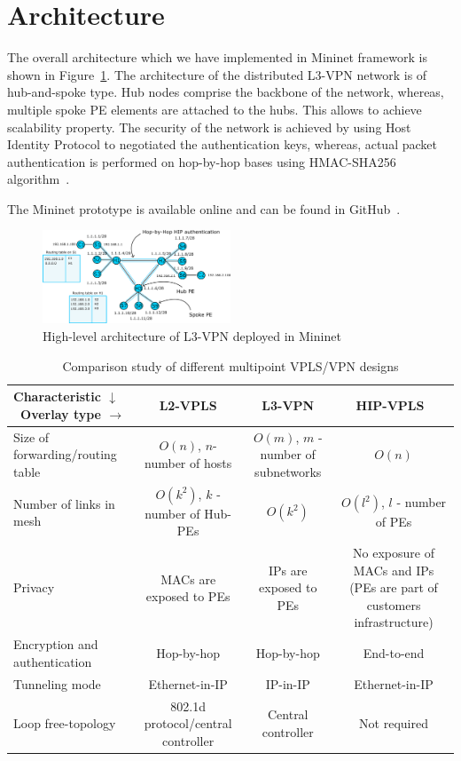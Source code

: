 \section{Architecture}
\label{section:architecture}

The overall architecture which we have implemented in Mininet framework is 
shown in Figure~\ref{fig:arch}. The architecture of the distributed L3-VPN 
network is of hub-and-spoke type. Hub nodes comprise the backbone of the network,
whereas, multiple spoke PE elements are attached to the hubs. This allows to
achieve scalability property. The security of the network is achieved by using 
Host Identity Protocol to negotiated the authentication keys, whereas, actual
packet authentication is performed on hop-by-hop bases using HMAC-SHA256 algorithm~\cite{Stinson:Cryptography}. 

The Mininet prototype is available online and can be found in GitHub~\cite{l3vpn}.

\begin{figure}[!h]
	\includegraphics[width=0.5\textwidth]{graphics/arch.png}
	\caption{High-level architecture of L3-VPN deployed in Mininet}
	\label{fig:arch}
\end{figure}

\begin{table}
        \begin{tabular}{|l|c|c|c|}
        \hline
        Characteristic $\downarrow$ \ Overlay type $\rightarrow$ & L2-VPLS & L3-VPN & HIP-VPLS~\cite{hipvpls} \\\hline
        Size of forwarding/routing table & $O(n)$, $n$-number of hosts & $O(m)$, $m$ - number of subnetworks & $O(n)$\\\hline
        Number of links in mesh & $O(k^2)$, $k$ - number of Hub-PEs & $O(k^2)$ & $O(l^2)$, $l$ - number of PEs \\\hline
        Privacy & MACs are exposed to PEs & IPs are exposed to PEs & No exposure of MACs and IPs (PEs are part of customers infrastructure) \\\hline
        Encryption and authentication & Hop-by-hop & Hop-by-hop & End-to-end \\\hline
        Tunneling mode & Ethernet-in-IP & IP-in-IP & Ethernet-in-IP \\\hline
        Loop free-topology & 802.1d protocol/central controller & Central controller & Not required \\\hline
        \end{tabular}
        \label{tab:analysis}
        \caption {Comparison study of different multipoint VPLS/VPN designs}
\end{table}


